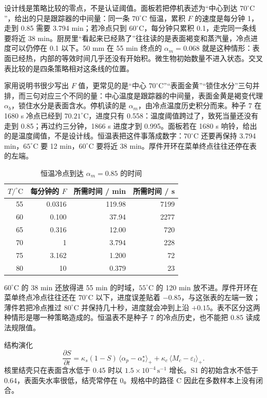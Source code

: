 设计线是策略比较的零点，不是认证阈值。面板若把停机表述为“中心到达 \(70^\circ\mathrm{C}\)”，给出的只是跟踪器的中间量：同一条 \(70^\circ\mathrm{C}\) 恒温，累积 \(F\) 的速度是每分钟 1，走到 0.85 需要 3.794 min；若冷点只到 \(60^\circ\mathrm{C}\)，每分钟只累积 0.1，走完同一条线要将近 38 min。厨房里“看起来已经熟了”往往读的是表面褐变和蒸汽量，冷点进度可以仍停在 0.1 以下。50 mm 在 55 min 终点的 \(\alpha_m=0.068\) 就是这种情形：表面已经热，内部的等效时间几乎还没有开始积。微生物初始数量不进入状态。交叉表比较的是四条策略相对这条线的位置。

家用说明书很少写出 \(F\) 值，更常见的是“中心 \(70^\circ\mathrm{C}\)”“表面金黄”“锁住水分”三句并排，而三句对应三个不同的量：中心温度是跟踪器的中间量，表面金黄是褐变代理 \(\alpha_b\)，锁住水分是表面含水。停机读的是 \(\alpha_m\)，由冷点温度历史积分而来。种子 7 在 1680 s 冷点已经到 \(70.21^\circ\mathrm{C}\)，进度只有 0.558：温度阈值跨过了，致死当量还没有走到 0.85；再过约三分钟，1866 s 进度才到 0.995。面板若在 1680 s 响铃，给出的是温度阈值，不是设计线。恒温表把这件事落成数字：\(70^\circ\mathrm{C}\) 还要再保持 3.794 min，\(65^\circ\mathrm{C}\) 要 12 min，\(60^\circ\mathrm{C}\) 要将近 38 min。厚件开环在菜单终点往往还停在表的左端。

\begin{table}[htbp]
\centering
\caption{恒温冷点到达 \(\alpha_m=0.85\) 的时间}
\label{tab:constT}
\begin{tabular}{rrrr}
\toprule
\(T/^\circ\mathrm{C}\) & 每分钟的 \(F\) & 所需时间 / min & 所需时间 / s \\
\midrule
55 & 0.0316 & 119.98 & 7199 \\
60 & 0.100 & 37.94 & 2277 \\
65 & 0.316 & 12.00 & 720 \\
70 & 1 & 3.794 & 228 \\
75 & 3.162 & 1.200 & 72 \\
80 & 10 & 0.379 & 23 \\
\bottomrule
\end{tabular}
\end{table}

\(60^\circ\mathrm{C}\) 的 38 min 还放得进 55 min 的时域，\(55^\circ\mathrm{C}\) 的 120 min 放不进。厚件开环在菜单终点冷点往往还在 \(70^\circ\mathrm{C}\) 以下，进度误差贴着 \(-0.85\)，与这张表的左端一致；薄件若把冷点推过 \(80^\circ\mathrm{C}\) 并保持几十秒，进度就会冲到上沿 \(+0.15\)。表不区分这两种情形是哪一种策略造成的。恒温表不是种子 7 的冷点历史，也不能把 0.85 读成法规限值。

结构演化
\begin{equation}
\label{eq:structure}
\frac{\partial S}{\partial t}
=\kappa_s(1-S)\,\langle\alpha_p-\alpha_s^\star\rangle_+
+\kappa_c\,\langle M_{c}- \varepsilon_l\rangle_+.
\end{equation}
核里结壳只在表面含水低于 0.45 时以 \(1.5\times 10^{-4}\,\mathrm{s}^{-1}\) 增长。S1 的初始含水不低于 0.64，表面失水率很低，结壳常停在 0。规格中的路径 C 因此在多数样本上没有闭合。

